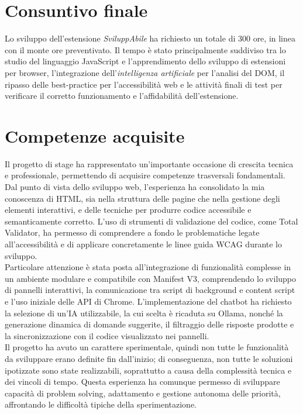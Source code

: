 \section{Consuntivo finale}
\noindent Lo sviluppo dell’estensione \textit{SviluppAbile} ha richiesto un totale di 300 ore, in linea con il monte ore preventivato. Il tempo è stato principalmente suddiviso tra lo studio del linguaggio JavaScript e l’apprendimento dello sviluppo di estensioni per browser, l’integrazione dell'\textit{intelligenza artificiale} per l’analisi del DOM, il ripasso delle best-practice per l'accessibilità web e le attività finali di test per verificare il corretto funzionamento e l’affidabilità dell’estensione. 

\section{Competenze acquisite}
\noindent Il progetto di stage ha rappresentato un’importante occasione di crescita tecnica e professionale, permettendo di acquisire competenze trasversali fondamentali. Dal punto di vista dello sviluppo web, l’esperienza ha consolidato la mia conoscenza di HTML, sia nella struttura delle pagine che nella gestione degli elementi interattivi, e delle tecniche per produrre codice accessibile e semanticamente corretto. L’uso di strumenti di validazione del codice, come Total Validator, ha permesso di comprendere a fondo le problematiche legate all’accessibilità e di applicare concretamente le linee guida WCAG durante lo sviluppo.\\
Particolare attenzione è stata posta all’integrazione di funzionalità complesse in un ambiente modulare e compatibile con Manifest V3, comprendendo lo sviluppo di pannelli interattivi, la comunicazione tra script di background e content script e l’uso iniziale delle API di Chrome. L’implementazione del chatbot ha richiesto la selezione di un’IA utilizzabile, la cui scelta è ricaduta su Ollama, nonché la generazione dinamica di domande suggerite, il filtraggio delle risposte prodotte e la sincronizzazione con il codice visualizzato nei pannelli.\\
Il progetto ha avuto un carattere sperimentale, quindi non tutte le funzionalità da sviluppare erano definite fin dall’inizio; di conseguenza, non tutte le soluzioni ipotizzate sono state realizzabili, soprattutto a causa della complessità tecnica e dei vincoli di tempo. Questa esperienza ha comunque permesso di sviluppare capacità di problem solving, adattamento e gestione autonoma delle priorità, affrontando le difficoltà tipiche della sperimentazione.\\
